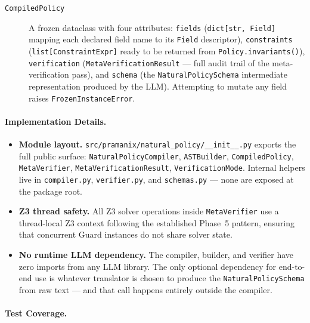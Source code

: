 \documentclass[12pt,a4paper,oneside]{report}
\newcommand{\fname}[1]{\texttt{#1}}          %
\newcommand{\code}[1]{\texttt{#1}}           %
\begin{document}
\begin{description}
\item[\code{CompiledPolicy}]
  A frozen dataclass with four attributes: \code{fields}
  (\code{dict[str, Field]} mapping each declared field name to its
  \code{Field} descriptor), \code{constraints}
  (\code{list[ConstraintExpr]} ready to be returned from
  \code{Policy.invariants()}), \code{verification}
  (\code{MetaVerificationResult} — full audit trail of the meta-verification
  pass), and \code{schema} (the \code{NaturalPolicySchema} intermediate
  representation produced by the LLM).  Attempting to mutate any field raises
  \code{FrozenInstanceError}.

\end{description}

\paragraph{Implementation Details.}

\begin{itemize}

\item \textbf{Module layout.}
  \fname{src/pramanix/natural\_policy/\_\_init\_\_.py} exports the full public
  surface: \code{NaturalPolicyCompiler}, \code{ASTBuilder},
  \code{CompiledPolicy}, \code{MetaVerifier}, \code{MetaVerificationResult},
  \code{VerificationMode}.  Internal helpers live in \fname{compiler.py},
  \fname{verifier.py}, and \fname{schemas.py} — none are exposed at the
  package root.

\item \textbf{Z3 thread safety.}  All Z3 solver operations inside
  \code{MetaVerifier} use a thread-local Z3 context following the established
  Phase~5 pattern, ensuring that concurrent Guard instances do not share
  solver state.

\item \textbf{No runtime LLM dependency.}  The compiler, builder, and
  verifier have zero imports from any LLM library.  The only optional
  dependency for end-to-end use is whatever translator is chosen to produce
  the \code{NaturalPolicySchema} from raw text — and that call happens
  entirely outside the compiler.

\end{itemize}

\paragraph{Test Coverage.}
\end{document}
